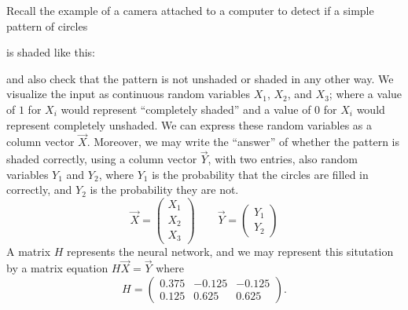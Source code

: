 \documentclass{ximera}
\begin{document}
\begin{example}
\begin{explanation}
  \end{explanation}
\end{example}

\begin{example}
  Recall the example of a camera attached to a computer to detect if
  a simple pattern of circles
  \begin{center}
  \end{center}
  is shaded like this:
  \begin{center}
  \end{center}
  and also check that the pattern is not unshaded or shaded in any
  other way. We visualize the input as continuous
  random variables $X_1$, $X_2$, and $X_3$; where a value of $1$ for
  $X_i$ would represent ``completely shaded'' and a value of $0$ for
  $X_i$ would represent completely unshaded. We can express these random
  variables as a column vector $\vec{X}$. Moreover, we may write the
  ``answer'' of whether the pattern is shaded correctly, using a column
  vector $\vec{Y}$, with two entries, also random variables $Y_1$ and
  $Y_2$, where $Y_1$ is the probability that the circles are filled in
  correctly, and $Y_2$ is the probability they are not.
  \[
    \vec{X} = \begin{pmatrix} X_1 \\ X_2 \\ X_3 \end{pmatrix} \qquad \vec{Y} =
    \begin{pmatrix} Y_1 \\ Y_2 \end{pmatrix}
  \]
  A matrix $H$ represents the neural network, and we may represent this
  situtation by a matrix equation $H\vec{X} = \vec{Y}$ where
  \[
    H = \begin{pmatrix}
      0.375 & -0.125 & -0.125 \\
      0.125 & 0.625  & 0.625
    \end{pmatrix}.
  \]
  \begin{enumerate}

\end{enumerate}
\end{example}
\end{document}
